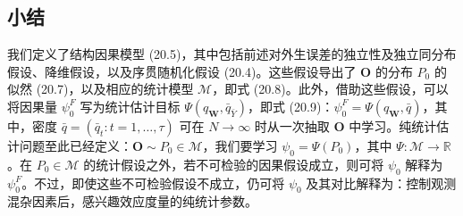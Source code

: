 \subsection{小结}

我们定义了结构因果模型 (20.5)，其中包括前述对外生误差的独立性及独立同分布假设、降维假设，以及序贯随机化假设 (20.4)。这些假设导出了 $\mathbf O$ 的分布 $P_0$ 的似然 (20.7)，以及相应的统计模型 $\mathcal M$，即式 (20.8)。此外，借助这些假设，可以将因果量 $\psi_0^F$ 写为统计估计目标 $\Psi(q_{\mathbf W},\bar q_{\bar Y})$，即式 (20.9)：$\psi_0^F=\Psi(q_{\mathbf W},\bar q)$，其中，密度 $\bar q=(\bar q_t:t=1,\ldots,\tau)$ 可在 $N\to\infty$ 时从一次抽取 $\mathbf O$ 中学习。纯统计估计问题至此已经定义：$\mathbf O\sim P_0\in\mathcal M$，我们要学习 $\psi_0=\Psi(P_0)$，其中 $\Psi:\mathcal M\to\mathbb R$。在 $P_0\in\mathcal M$ 的统计假设之外，若不可检验的因果假设成立，则可将 $\psi_0$ 解释为 $\psi_0^F$。不过，即使这些不可检验假设不成立，仍可将 $\psi_0$ 及其对比解释为：控制观测混杂因素后，感兴趣效应度量的纯统计参数。
